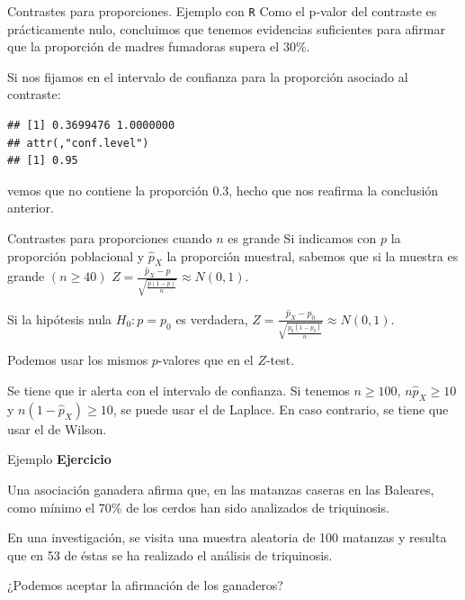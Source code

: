 \documentclass[
  ignorenonframetext,
]{beamer}
\newenvironment{Shaded}{\begin{snugshade}}{\end{snugshade}}
\newcommand{\DataTypeTok}[1]{\textcolor[rgb]{0.13,0.29,0.53}{#1}}
\newcommand{\DecValTok}[1]{\textcolor[rgb]{0.00,0.00,0.81}{#1}}
\newcommand{\FloatTok}[1]{\textcolor[rgb]{0.00,0.00,0.81}{#1}}
\newcommand{\KeywordTok}[1]{\textcolor[rgb]{0.13,0.29,0.53}{\textbf{#1}}}
\newcommand{\NormalTok}[1]{#1}
\newcommand{\OperatorTok}[1]{\textcolor[rgb]{0.81,0.36,0.00}{\textbf{#1}}}
\newcommand{\StringTok}[1]{\textcolor[rgb]{0.31,0.60,0.02}{#1}}
\begin{document}
\begin{frame}[fragile]{Contrastes para proporciones. Ejemplo con
\texttt{R}}
\protect\hypertarget{contrastes-para-proporciones.-ejemplo-con-r-5}{}
Como el p-valor del contraste es prácticamente nulo, concluimos que
tenemos evidencias suficientes para afirmar que la proporción de madres
fumadoras supera el 30\%.

Si nos fijamos en el intervalo de confianza para la proporción asociado
al contraste:

\begin{Shaded}
\end{Shaded}

\begin{verbatim}
## [1] 0.3699476 1.0000000
## attr(,"conf.level")
## [1] 0.95
\end{verbatim}

vemos que no contiene la proporción 0.3, hecho que nos reafirma la
conclusión anterior.
\end{frame}

\begin{frame}{Contrastes para proporciones cuando \(n\) es grande}
\protect\hypertarget{contrastes-para-proporciones-cuando-n-es-grande}{}
Si indicamos con \(p\) la proporción poblacional y \(\widehat{p}_X\) la
proporción muestral, sabemos que si la muestra es grande \((n\geq 40)\)
\(Z=\frac{\widehat{p}_X-p}{\sqrt{\frac{p(1-p)}{n}}}\approx N(0,1).\)

Si la hipótesis nula \(H_0:p=p_0\) es verdadera,
\(Z=\frac{\widehat{p}_X-p_0}{\sqrt{\frac{p_0(1-p_0)}{n}}}\approx N(0,1).\)

Podemos usar los mismos \(p\)-valores que en el \(Z\)-test.

Se tiene que ir alerta con el intervalo de confianza. Si tenemos
\(n\geq 100\), \(n\hat{p}_X\geq 10\) y \(n(1-\hat{p}_X)\geq 10\), se
puede usar el de Laplace. En caso contrario, se tiene que usar el de
Wilson.
\end{frame}

\begin{frame}{Ejemplo}
\protect\hypertarget{ejemplo-15}{}
\textbf{Ejercicio}

Una asociación ganadera afirma que, en las matanzas caseras en las
Baleares, como mínimo el 70\% de los cerdos han sido analizados de
triquinosis.

En una investigación, se visita una muestra aleatoria de 100 matanzas y
resulta que en 53 de éstas se ha realizado el análisis de triquinosis.

¿Podemos aceptar la afirmación de los ganaderos?
\end{frame}
\end{document}
